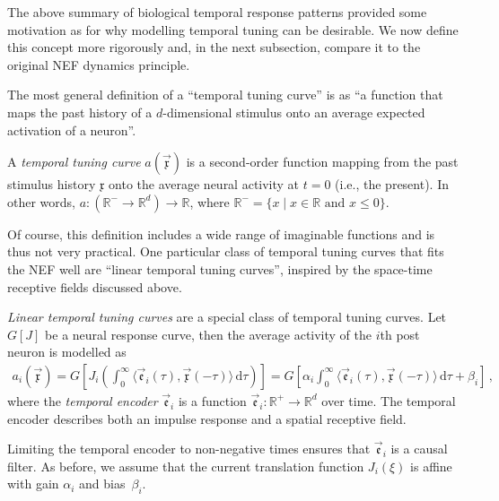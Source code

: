 The above summary of biological temporal response patterns provided some motivation as for why modelling temporal tuning can be desirable.
We now define this concept more rigorously and, in the next subsection, compare it to the original NEF dynamics principle.

The most general definition of a \enquote{temporal tuning curve} is as \enquote{a function that maps the past history of a $d$-dimensional stimulus onto an average expected activation of a neuron}.
	
\begin{definition}
	\label{def:temporal_tuning_curve}
	A \emph{temporal tuning curve} $a(\vec{\mathfrak{x}})$ is a second-order function mapping from the past stimulus history $\mathfrak{x}$ onto the average neural activity at $t = 0$ (i.e., the present).
	In other words, $a : (\mathbb{R}^- \longrightarrow \mathbb{R}^d) \longrightarrow \mathbb{R}$, where $\mathbb{R}^- = \{ x \mid x \in \mathbb{R} \text{ and } x \leq 0 \}$.
\end{definition}

Of course, this definition includes a wide range of imaginable functions and is thus not very practical.
One particular class of temporal tuning curves that fits the NEF well are \enquote{linear temporal tuning curves}, inspired by the space-time receptive fields discussed above.

\begin{definition}
	\label{def:linear_temporal_tuning}
	\emph{Linear temporal tuning curves} are a special class of temporal tuning curves.
	Let $G[J]$ be a neural response curve, then the average activity of the $i$th post neuron is modelled as
	\begin{align}
		a_i(\vec{\mathfrak{x}})
			= G\left[ J_i \left( \int_{0}^\infty \!\!\! \big\langle \vec{\mathfrak{e}}_i(\tau), \vec{\mathfrak{x}}(-\tau) \big\rangle 	\,\mathrm{d}\tau \right) \right]
		= G\left[ \alpha_i \! \int_{0}^\infty \!\!\! \big\langle \vec{\mathfrak{e}}_i(\tau), \vec{\mathfrak{x}}(-\tau) \big\rangle \,\mathrm{d}\tau + \beta_i \right] \,,
		\label{eqn:temporal_tuning_curve}
	\end{align}
	where the \emph{temporal encoder} $\vec{\mathfrak{e}}_i$ is a function $\vec{\mathfrak{e}}_i : \mathbb{R}^+ \longrightarrow \mathbb{R}^d$ over time. The temporal encoder describes both an impulse response and a spatial receptive field.
\end{definition}
\noindent Limiting the temporal encoder to non-negative times ensures that $\vec{\mathfrak{e}}_i$ is a causal filter.
As before, we assume that the current translation function $J_i(\xi)$ is affine with gain $\alpha_i$ and bias~$\beta_i$.

